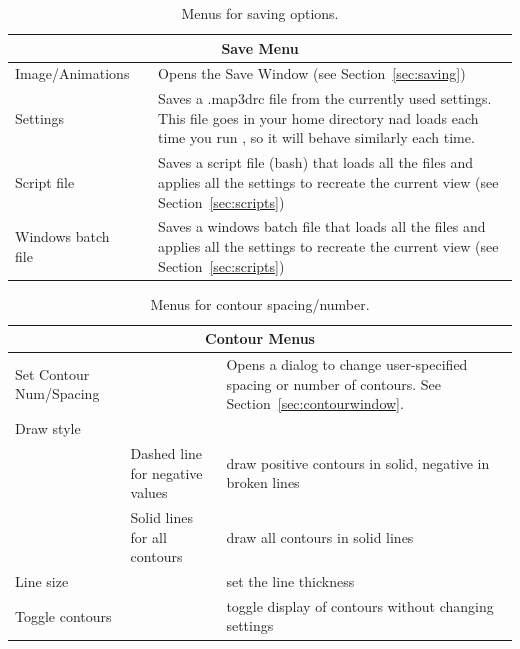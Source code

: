 \begin{table}[ht]
\caption{\label{table:saving}Menus for saving options.}
  \begin{center}
    \begin{tabular}{|l|l|p{3 in}|} \hline
      \multicolumn{3}{|c|}{\textbf{Save Menu}} \\ \hline
    Image/Animations & &  Opens the Save Window (see Section~\ref{sec:saving})  \\
    Settings & & Saves a .map3drc file from the currently used settings. This
        file goes in your home directory nad loads each time you run \map{}, so
	it will behave similarly each time. \\
    Script file & & Saves a script file (bash) that loads all the files and
        applies all the settings to recreate the current view (see Section~\ref{sec:scripts}) \\
    Windows batch file & & Saves a windows batch file that loads all the files
        and applies all the settings to recreate the current view (see Section~\ref{sec:scripts})\\ \hline
    \end{tabular}
  \end{center}
\end{table}

\begin{table}[ht]
\caption{\label{table:contours}Menus for contour spacing/number.}
  \begin{center}
    \begin{tabular}{|l|l|p{3 in}|} \hline
      \multicolumn{3}{|c|}{\textbf{Contour Menus}} \\ \hline
    Set Contour Num/Spacing & & Opens a dialog to change user-specified 
    spacing or number of contours. See Section~\ref{sec:contourwindow}.
    \\ 
    Draw style & & \\
    & Dashed line for negative values & draw positive contours in solid,
    negative in broken lines\\
    & Solid lines for all contours & draw all contours in solid lines\\
    Line size & & set the line thickness \\ \hline
    Toggle contours & & toggle display of contours
    without changing settings \\ \hline
    \end{tabular}
  \end{center}
\end{table}

